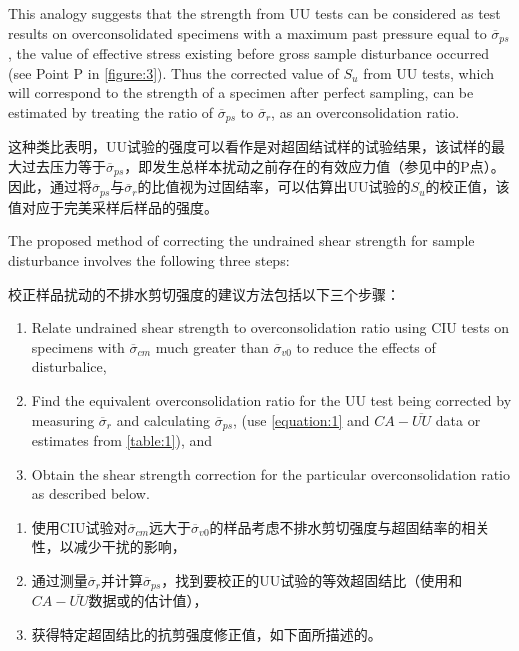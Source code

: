 \begin{paracol}{2}
    
    This analogy suggests that the strength from UU tests can be considered as test results on overconsolidated specimens with a maximum past pressure equal to $\overline{\sigma}_{ps}$, the value of effective stress existing before gross sample disturbance occurred (see Point P in \autoref{figure:3}). Thus the corrected value of $S_u$ from UU tests, which will correspond to the strength of a specimen after perfect sampling, can be estimated by treating the ratio of $\overline{\sigma}_{ps}$ to $\overline{\sigma}_r$, as an overconsolidation ratio.

    \switchcolumn

    这种类比表明，UU试验的强度可以看作是对超固结试样的试验结果，该试样的最大过去压力等于$\overline{\sigma}_{ps}$，即发生总样本扰动之前存在的有效应力值（参见中的P点）。 因此，通过将$\overline{\sigma}_{ps}$与$\overline{\sigma}_r$的比值视为过固结率，可以估算出UU试验的$S_u$的校正值，该值对应于完美采样后样品的强度。

    \switchcolumn*

    The proposed method of correcting the undrained shear strength for sample disturbance involves the following three steps: 

    \switchcolumn
   
    校正样品扰动的不排水剪切强度的建议方法包括以下三个步骤：

    \switchcolumn*

    \begin{enumerate}
        \item Relate undrained shear strength to overconsolidation ratio using CIU tests on specimens with $\overline{\sigma}_{cm}$ much greater than $\overline{\sigma}_{v0}$ to reduce the effects of disturbalice, 
        \item Find the equivalent overconsolidation ratio for the UU test being corrected by measuring $\overline{\sigma}_r$ and calculating $\overline{\sigma}_{ps}$, (use \autoref{equation:1} and $CA-\overline{UU}$ data or estimates from \autoref{table:1}), and
        \item Obtain the shear strength correction for the particular overconsolidation ratio as described below.
    \end{enumerate}

    \switchcolumn
    
    \begin{enumerate}
        \item 使用CIU试验对$\overline{\sigma}_{cm}$远大于$\overline{\sigma}_{v0}$的样品考虑不排水剪切强度与超固结率的相关性，以减少干扰的影响，
        \item 通过测量$\overline{\sigma}_r$并计算$\overline{\sigma}_{ps}$，找到要校正的UU试验的等效超固结比（使用和$CA-\overline{UU}$数据或的估计值），
        \item 获得特定超固结比的抗剪强度修正值，如下面所描述的。
    \end{enumerate}


\end{paracol}
